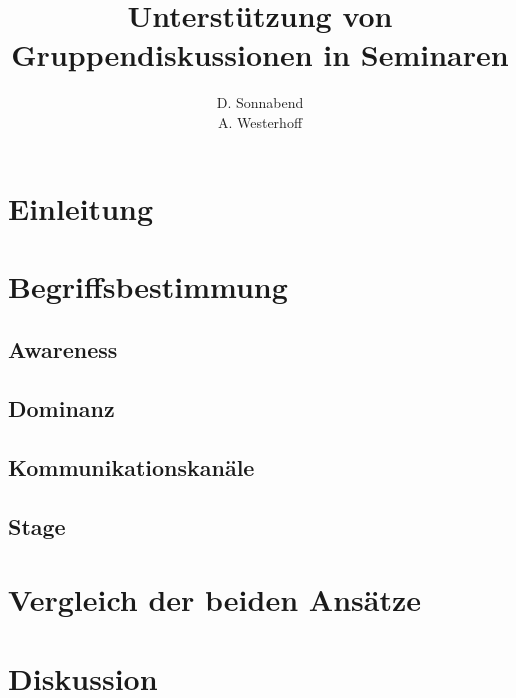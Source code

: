 \documentclass{seminarvorlage}
\begin{document}
\title{Unterstützung von Gruppendiskussionen in Seminaren}
\author{
  \alignauthor D. Sonnabend\\
  \alignauthor A. Westerhoff\\
}

\maketitle


\section{Einleitung}

\section{Begriffsbestimmung}
\subsection{Awareness}
\subsection{Dominanz}
\subsection{Kommunikationskanäle}
\subsection{Stage}






\section{Vergleich der beiden Ansätze}

\section{Diskussion}

\end{document}
